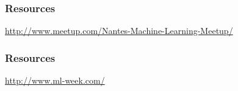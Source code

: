 \begin{frame}
\end{frame}

\begin{frame}
\end{frame}

\begin{frame}
\end{frame}

\begin{frame}
\end{frame}

\begin{frame}
\end{frame}

\begin{frame}
\end{frame}

\begin{frame}
\end{frame}

\begin{frame}
\end{frame}

\begin{frame}
\end{frame}


\begin{frame}
  \frametitle{Resources}

  \vspace{5mm}
  \centerline{\url{http://www.meetup.com/Nantes-Machine-Learning-Meetup/}}
\end{frame}

\begin{frame}
  \frametitle{Resources}

  \vspace{5mm}
  \centerline{\url{http://www.ml-week.com/}}
\end{frame}

\begin{frame}
\end{frame}


